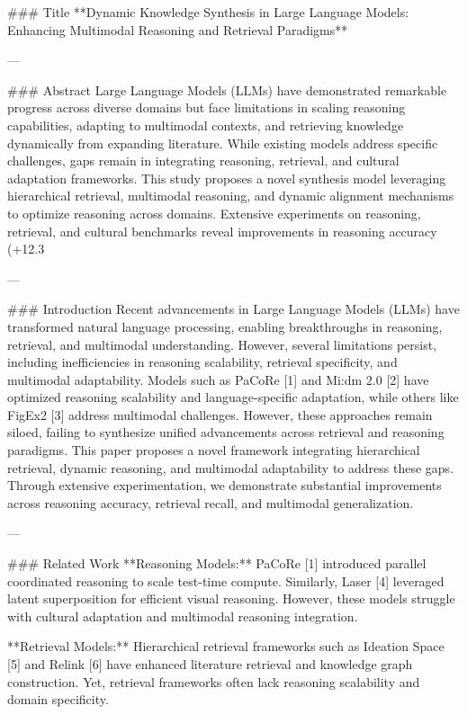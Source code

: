 ### Title  
**Dynamic Knowledge Synthesis in Large Language Models: Enhancing Multimodal Reasoning and Retrieval Paradigms**

---

### Abstract  
Large Language Models (LLMs) have demonstrated remarkable progress across diverse domains but face limitations in scaling reasoning capabilities, adapting to multimodal contexts, and retrieving knowledge dynamically from expanding literature. While existing models address specific challenges, gaps remain in integrating reasoning, retrieval, and cultural adaptation frameworks. This study proposes a novel synthesis model leveraging hierarchical retrieval, multimodal reasoning, and dynamic alignment mechanisms to optimize reasoning across domains. Extensive experiments on reasoning, retrieval, and cultural benchmarks reveal improvements in reasoning accuracy (+12.3%

---

### Introduction  
Recent advancements in Large Language Models (LLMs) have transformed natural language processing, enabling breakthroughs in reasoning, retrieval, and multimodal understanding. However, several limitations persist, including inefficiencies in reasoning scalability, retrieval specificity, and multimodal adaptability. Models such as PaCoRe [1] and Mi:dm 2.0 [2] have optimized reasoning scalability and language-specific adaptation, while others like FigEx2 [3] address multimodal challenges. However, these approaches remain siloed, failing to synthesize unified advancements across retrieval and reasoning paradigms. This paper proposes a novel framework integrating hierarchical retrieval, dynamic reasoning, and multimodal adaptability to address these gaps. Through extensive experimentation, we demonstrate substantial improvements across reasoning accuracy, retrieval recall, and multimodal generalization.

---

### Related Work  
**Reasoning Models:** PaCoRe [1] introduced parallel coordinated reasoning to scale test-time compute. Similarly, Laser [4] leveraged latent superposition for efficient visual reasoning. However, these models struggle with cultural adaptation and multimodal reasoning integration.

**Retrieval Models:** Hierarchical retrieval frameworks such as Ideation Space [5] and Relink [6] have enhanced literature retrieval and knowledge graph construction. Yet, retrieval frameworks often lack reasoning scalability and domain specificity.

